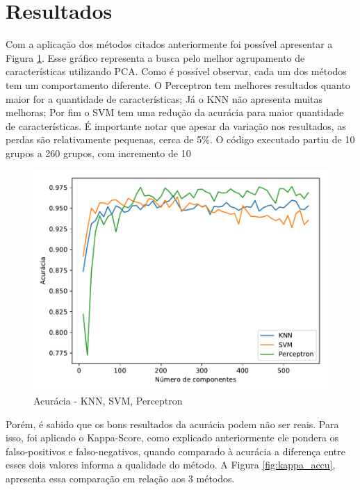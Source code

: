 \documentclass[12pt]{article}
\begin{document}
\section{Resultados}
	Com a aplicação dos métodos citados anteriormente foi possível apresentar a Figura \ref{fig:todos}. Esse gráfico representa a busca pelo melhor agrupamento de características utilizando PCA. Como é possível observar, cada um dos métodos tem um comportamento diferente. O Perceptron tem melhores resultados quanto maior for a quantidade de características; Já o KNN não apresenta muitas melhoras; Por fim o SVM tem uma redução da acurácia para maior quantidade de características. É importante notar que apesar da variação nos resultados, as perdas são relativamente pequenas, cerca de 5\%. O código executado partiu de 10 grupos a 260 grupos, com incremento de 10
	\begin{figure}[!htb]
	\centering
	\includegraphics[width=.5\textwidth]{Todos.pdf}
	\caption{Acurácia - KNN, SVM, Perceptron}
	\label{fig:todos}
	\end{figure}
	Porém, é sabido que os bons resultados da acurácia podem não ser reais. Para isso, foi aplicado o Kappa-Score, como explicado anteriormente ele pondera os falso-positivos e falso-negativos, quando comparado à acurácia a diferença entre esses dois valores informa a qualidade do método. A Figura \ref{fig:kappa_accu}, apresenta essa comparação em relação aos 3 métodos.
\end{document}
